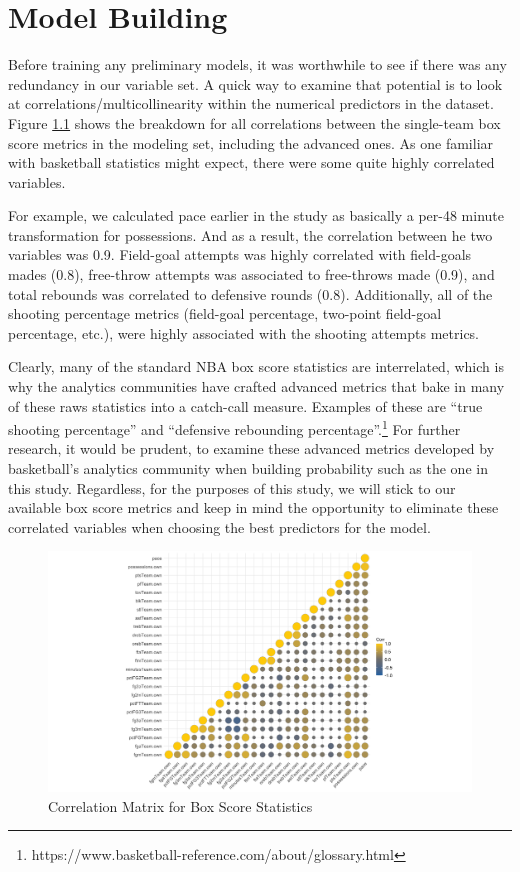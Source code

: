 \documentclass [MS] {uclathes}
\begin{document}
\chapter{Model Building}

Before training any preliminary models, it was worthwhile to see if there was any redundancy in our variable set. A quick way to examine that potential is to look at correlations/multicollinearity within the numerical predictors in the dataset. Figure \ref{fig:corrs} shows the breakdown for all correlations between the single-team box score metrics in the modeling set, including the advanced ones. As one familiar with basketball statistics might expect, there were some quite highly correlated variables.

For example, we calculated pace earlier in the study as basically a per-48 minute transformation for possessions. And as a result, the correlation between he two variables was 0.9. Field-goal attempts was highly correlated with field-goals mades (0.8), free-throw attempts was associated to free-throws made (0.9), and total rebounds was correlated to defensive rounds (0.8). Additionally, all of the shooting percentage metrics (field-goal percentage, two-point field-goal percentage, etc.), were highly associated with the shooting attempts metrics. 

Clearly, many of the standard NBA box score statistics are interrelated, which is why the analytics communities have crafted advanced metrics that bake in many of these raws statistics into a catch-call measure. Examples of these are ``true shooting percentage'' and ``defensive rebounding percentage''.\footnote{https://www.basketball-reference.com/about/glossary.html} For further research, it would be prudent, to examine these advanced metrics developed by basketball's analytics community when building probability such as the one in this study. Regardless, for the purposes of this study, we will stick to our available box score metrics and keep in mind the opportunity to eliminate these correlated variables when choosing the best predictors for the model. 

\begin{figure}[h]
\centering
  \includegraphics[width=500px]{corrs_plot.png}
  \caption{Correlation Matrix for Box Score Statistics}
  \label{fig:corrs}
\end{figure}
\end{document}
